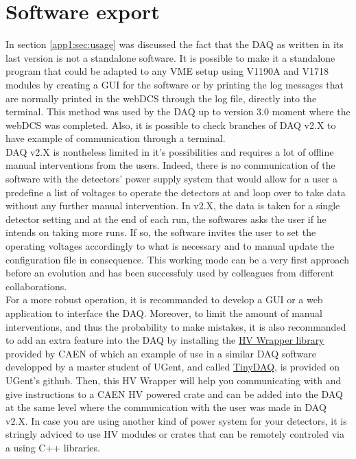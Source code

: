 \section{Software export}
\label{app1:sec:export}
	
	In section \ref{app1:sec:usage} was discussed the fact that the DAQ as written in its last version is not a standalone software. It is possible to make it a standalone program that could be adapted to any VME setup using V1190A and V1718 modules by creating a GUI for the software or by printing the log messages that are normally printed in the webDCS through the log file, directly into the terminal. This method was used by the DAQ up to version 3.0 moment where the webDCS was completed. Also, it is possible to check branches of DAQ v2.X to have example of communication through a terminal.\\
	DAQ v2.X is nontheless limited in it's possibilities and requires a lot of offline manual interventions from the users. Indeed, there is no communication of the software with the detectors' power supply system that would allow for a user a predefine a list of voltages to operate the detectors at and loop over to take data without any further manual intervention. In v2.X, the data is taken for a single detector setting and at the end of each run, the softwares asks the user if he intends on taking more runs. If so, the software invites the user to set the operating voltages accordingly to what is necessary and to manual update the configuration file in consequence. This working mode can be a very first approach before an evolution and has been successfuly used by colleagues from different collaborations.\\
	For a more robust operation, it is recommanded to develop a GUI or a web application to interface the DAQ. Moreover, to limit the amount of manual interventions, and thus the probability to make mistakes, it is also recommanded to add an extra feature into the DAQ by installing the \href{http://caen.it/csite/CaenProd.jsp?idmod=835&parent=42}{HV Wrapper library} provided by CAEN of which an example of use in a similar DAQ software developped by a master student of UGent, and called \href{https://github.ugent.be/favassch/TinyDAQ}{TinyDAQ}, is provided on UGent's github. Then, this HV Wrapper will help you communicating with and give instructions to a CAEN HV powered crate and can be added into the DAQ at the same level where the communication with the user was made in DAQ v2.X. In case you are using another kind of power system for your detectors, it is stringly adviced to use HV modules or crates that can be remotely controled via a using C++ libraries.\\

\clearpage{\pagestyle{empty}\cleardoublepage}
